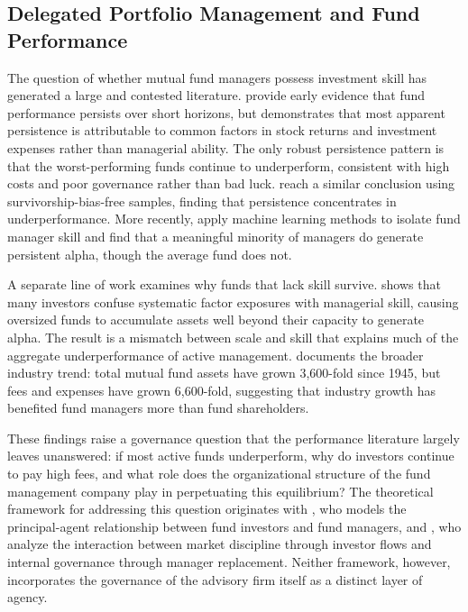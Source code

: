 \documentclass[hidelinks,12pt]{article}
\begin{document}
\subsection{Delegated Portfolio Management and Fund Performance}

The question of whether mutual fund managers possess investment skill has generated a large and contested literature. \citet{grinblatt1992persistence} provide early evidence that fund performance persists over short horizons, but \citet{carhart1997persistence} demonstrates that most apparent persistence is attributable to common factors in stock returns and investment expenses rather than managerial ability. The only robust persistence pattern is that the worst-performing funds continue to underperform, consistent with high costs and poor governance rather than bad luck. \citet{brown1995performance} reach a similar conclusion using survivorship-bias-free samples, finding that persistence concentrates in underperformance. More recently, \citet{kaniel2023machine} apply machine learning methods to isolate fund manager skill and find that a meaningful minority of managers do generate persistent alpha, though the average fund does not.

A separate line of work examines why funds that lack skill survive. \citet{song2020mismatch} shows that many investors confuse systematic factor exposures with managerial skill, causing oversized funds to accumulate assets well beyond their capacity to generate alpha. The result is a mismatch between scale and skill that explains much of the aggregate underperformance of active management. \citet{bogle2005mutual} documents the broader industry trend: total mutual fund assets have grown 3,600-fold since 1945, but fees and expenses have grown 6,600-fold, suggesting that industry growth has benefited fund managers more than fund shareholders.

These findings raise a governance question that the performance literature largely leaves unanswered: if most active funds underperform, why do investors continue to pay high fees, and what role does the organizational structure of the fund management company play in perpetuating this equilibrium? The theoretical framework for addressing this question originates with \citet{starks1987performance}, who models the principal-agent relationship between fund investors and fund managers, and \citet{dangl2008market}, who analyze the interaction between market discipline through investor flows and internal governance through manager replacement. Neither framework, however, incorporates the governance of the advisory firm itself as a distinct layer of agency.
\end{document}
